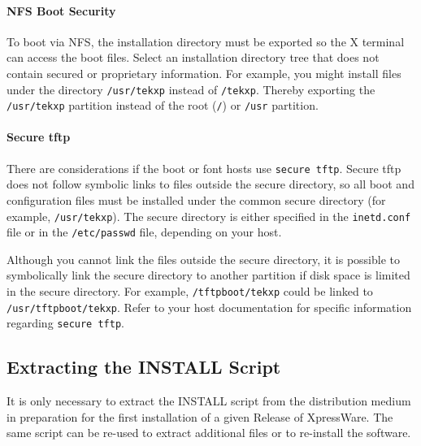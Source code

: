 \paragraph {NFS Boot Security}

To boot via NFS, the installation directory must be exported so the X terminal
can access the boot files. Select an installation directory tree that does not
contain secured or proprietary information. For example, you might install
files under the directory {\tt /usr/tekxp} instead of {\tt /tekxp}. Thereby
exporting the {\tt /usr/tekxp} partition instead of the root ({\tt /}) or
{\tt /usr} partition.

\paragraph {Secure tftp}

There are considerations if the boot or font hosts use {\tt secure tftp}. Secure
tftp does not follow symbolic links to files outside the secure directory, so
all boot and configuration files must be installed under the common secure
directory (for example, {\tt /usr/tekxp}). The secure directory is either
specified in the {\tt inetd.conf} file or in the {\tt /etc/passwd} file,
depending on your host.

Although you cannot link the files outside the secure directory, it is possible
to symbolically link the secure directory to another partition if disk space is
limited in the secure directory. For example, {\tt /tftpboot/tekxp} could be
linked to {\tt /usr/tftpboot/tekxp}. Refer to your host documentation for
specific information regarding {\tt secure tftp}.


\subsection {Extracting the INSTALL Script}

It is only necessary to extract the INSTALL script from the distribution medium
in preparation for the first installation of a given Release of XpressWare.
The same script can be re-used to extract additional files or to re-install the
software.

